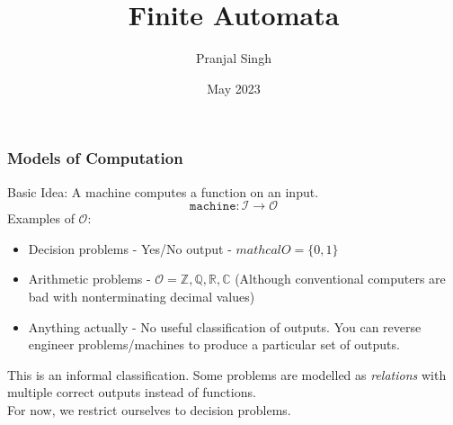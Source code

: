 \documentclass{beamer}
\title{Finite Automata}
\author{Pranjal Singh}
\institute{Stamatics Summer Project - TCS}
\date{May 2023}
\begin{document}
\frame{\titlepage}
\begin{frame}
\frametitle{Models of Computation}
Basic Idea: A machine computes a function on an input.\\
\[\mathtt{machine} : \mathcal{I} \rightarrow \mathcal{O}\]
\pause
Examples of \(\mathcal{O}\):
\begin{itemize}
    \item Decision problems - Yes/No output - \(mathcal{O} = \{0, 1\}\)
    \item Arithmetic problems - \(\mathcal{O} = \mathbb{Z}, \mathbb{Q}, \mathbb{R}, \mathbb{C}\) (Although conventional computers are bad with nonterminating decimal values)
    \item Anything actually - No useful classification of outputs. You can reverse engineer problems/machines to produce a particular set of outputs.
\end{itemize}
\pause
This is an informal classification. Some problems are modelled as \emph{relations} with multiple correct outputs instead of functions.\\
\pause
For now, we restrict ourselves to decision problems.
\end{frame}
\end{document}
